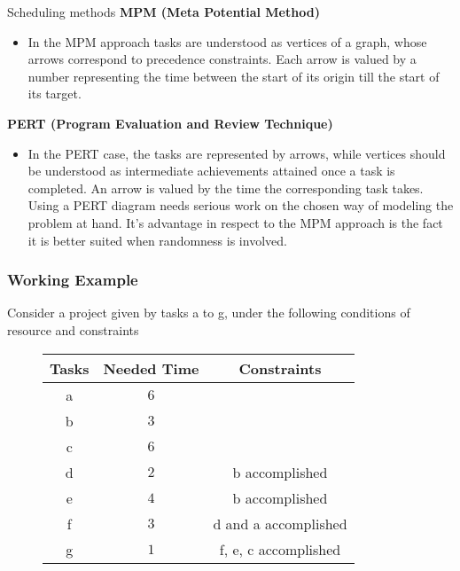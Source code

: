 \documentclass[32pt,aspectratio=169]{beamer}
\begin{document}
\begin{frame}{Scheduling methods}
   \textbf{MPM (Meta Potential Method)}
  \begin{paremph}
    \begin{itemize}
    \item[] In the MPM approach tasks are understood as vertices of a
      graph, whose arrows correspond to precedence constraints. Each
      arrow is valued by a number representing the time between the
      start of its origin till the start of its target.
    \end{itemize}
  \end{paremph}
  \pause
  \textbf{PERT (Program Evaluation and Review Technique)}
  \begin{paremph}
    \begin{itemize}
    \item[] In the PERT case, the tasks are represented by arrows,
      while vertices should be understood as intermediate achievements
      attained once a task is completed. An arrow is valued by the
      time the corresponding task takes. Using a PERT diagram needs
      serious work on the chosen way of modeling the problem at
      hand. It's advantage in respect to the MPM approach is the fact
      it is better suited when randomness is involved. 
    \end{itemize}
  \end{paremph}
\end{frame}

\begin{frame}
  \frametitle{Working Example}
  Consider a project given by tasks a to g, under the following
  conditions of resource and constraints
  \begin{figure}
    \begin{tabular}{|c|c|c|}
      \hline
      Tasks & Needed Time & Constraints \\
      \hline
      a & $6$ & \\
      \hline
      b & $3$ & \\
      \hline
      c & $6$ & \\
      \hline
      d & $2$ & b accomplished \\
      \hline
      e & $4$ & b accomplished \\
      \hline
      f & $3$ & d and a accomplished \\
      \hline
      g & $1$ & f, e, c accomplished \\
      \hline
    \end{tabular}
  \end{figure}
\end{frame}
\end{document}
